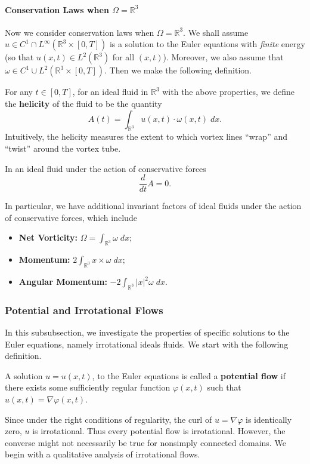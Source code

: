 \documentclass{article}
\begin{document}
\paragraph{Conservation Laws when $\Omega = \mathbb{R}^{3}$} Now we consider conservation laws when $\Omega = \mathbb{R}^{3}$. We shall assume $u \in C^{1}\cap L^{\infty}(\mathbb{R}^{3} \times [0,T])$ is a solution to the Euler equations with \textit{finite} energy (so that $u(x,t) \in L^{2}(\mathbb{R}^{3})$ for all $(x, t)$). Moreover, we also assume that $\omega \in C^{1} \cup L^{2}(\mathbb{R}^{3}\times [0,T])$. Then we make the following definition. 
\begin{definition}[Helicity]
	For any $t \in [0,T]$, for an ideal fluid in $\mathbb{R}^{3}$ with the above properties, we define the \textbf{helicity} of the fluid to be the quantity 
	\begin{equation}
		A(t) = \int_{\mathbb{R}^{3}}u(x,t)\cdot \omega(x, t)\;dx. 
		\label{eq:helicity}
	\end{equation}
	Intuitively, the helicity measures the extent to which vortex lines ``wrap'' and ``twist'' around the vortex tube. 
\end{definition} 
\begin{theorem}
	In an ideal fluid under the action of conservative forces 
	\begin{equation*}
		\frac{d}{dt}A = 0. 
	\end{equation*}
\end{theorem} 
In particular, we have additional invariant factors of ideal fluids under the action of conservative forces, which include \vspace{-0.25cm} 
\begin{itemize}[itemsep =-2pt]
	\item \textbf{Net Vorticity:} $\displaystyle \Omega = \int_{\mathbb{R}^{3}}\omega\;dx;$ 
	\item \textbf{Momentum:} $\displaystyle 2 \int_{\mathbb{R}^{3}}x \times \omega\;dx;$ 
	\item \textbf{Angular Momentum:} $\displaystyle -2\int_{\mathbb{R}^{3}}|x|^{2}\omega\;dx.$ 
\end{itemize}

\subsubsection{Potential and Irrotational Flows}
In this subsubsection, we investigate the properties of specific solutions to the Euler equations, namely irrotational ideals fluids. We start with the following definition. 
\begin{definition}
	A solution $u = u(x, t)$, to the Euler equations is called a \textbf{potential flow} if there exists some sufficiently regular function $\varphi(x, t)$ such that $u(x, t) = \nabla \varphi(x, t)$. 
\end{definition} 
Since under the right conditions of regularity, the curl of $u = \nabla \varphi$ is identically zero, $u$ is irrotational. Thus every potential flow is irrotational. However, the converse might not necessarily be true for nonsimply connected domains. We begin with a qualitative analysis of irrotational flows. 
\end{document}
